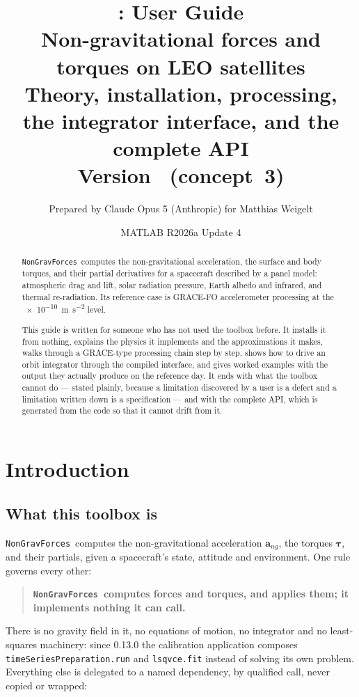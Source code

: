 \documentclass[11pt,a4paper]{report}
\title{\ngf: User Guide\\[6pt]
\large Non-gravitational forces and torques on LEO satellites\\[4pt]
\normalsize Theory, installation, processing, the integrator interface, and the complete API\\[2pt]
\normalsize Version \ngfversion\ (concept~3)}
\author{Prepared by Claude Opus 5 (Anthropic) for Matthias Weigelt}
\date{\ngfdate \quad\textperiodcentered\quad MATLAB R2026a Update 4}
\newcommand{\vv}[1]{\bm{#1}}
\newcommand{\ngf}{\texttt{NonGravForces}}
\begin{document}
\maketitle

\begin{abstract}
\ngf\ computes the non-gravitational acceleration, the surface and body torques, and their partial
derivatives for a spacecraft described by a panel model: atmospheric drag and lift, solar radiation
pressure, Earth albedo and infrared, and thermal re-radiation. Its reference case is GRACE-FO
accelerometer processing at the \SI{e-10}{\metre\per\second\squared} level.

This guide is written for someone who has not used the toolbox before. It installs it from nothing,
explains the physics it implements and the approximations it makes, walks through a GRACE-type
processing chain step by step, shows how to drive an orbit integrator through the compiled
interface, and gives worked examples with the output they actually produce on the reference day.
It ends with what the toolbox cannot do --- stated plainly, because a limitation discovered by a
user is a defect and a limitation written down is a specification --- and with the complete API,
which is generated from the code so that it cannot drift from it.
\end{abstract}

\tableofcontents
\clearpage

\chapter{Introduction}

\section{What this toolbox is}
\ngf\ computes the non-gravitational acceleration $\vv a_{ng}$, the torques $\vv\tau$, and their
partials, given a spacecraft's state, attitude and environment. One rule governs every other:

\begin{quote}
\textbf{\ngf\ computes forces and torques, and applies them; it implements nothing it can call.}
\end{quote}

There is no gravity field in it, no equations of motion, no integrator and no least-squares
machinery: since 0.13.0 the calibration application composes \texttt{timeSeriesPreparation.run}
and \texttt{lsqvce.fit} instead of solving its own problem. Everything else is delegated to a
named dependency, by qualified call, never copied or wrapped:
\end{document}
